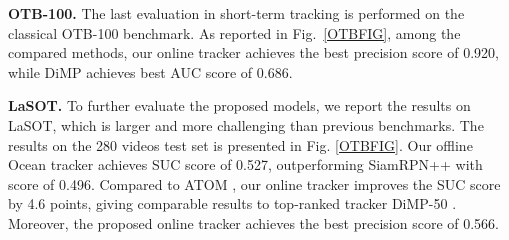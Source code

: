 \documentclass[runningheads]{llncs}
\begin{document}
\noindent\textbf{OTB-100.} The last evaluation in short-term tracking is performed on the classical OTB-100 benchmark. As reported in Fig.~\ref{OTBFIG}, among the compared methods, our online tracker achieves the best precision score of 0.920, while DiMP \cite{SiamRPN++} achieves best AUC score of 0.686. 


\noindent\textbf{LaSOT.}  To further evaluate the proposed models, we report the results on LaSOT, which is larger and more challenging than previous benchmarks. The results on the 280 videos test set is presented in Fig. \ref{OTBFIG}. Our offline Ocean tracker achieves SUC score of 0.527, outperforming SiamRPN++ with score of 0.496. Compared to ATOM \cite{ATOM},
our online tracker improves the SUC score by 4.6 points, giving comparable results to top-ranked tracker DiMP-50 \cite{DiMP}. Moreover, the proposed online tracker achieves the best precision score of 0.566.
\end{document}
